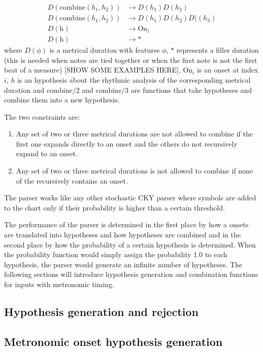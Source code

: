 \begin{align*}
\label{eq:rules}
D(\textrm{combine}(h_1, h_2)) &\rightarrow D(h_1) D(h_2)\\
D(\textrm{combine}(h_1, h_2)) &\rightarrow D(h_1) D(h_2) D((h_3)\\
D(\textrm{h}) &\rightarrow \textrm{On}_i\\
D(\textrm{h}) &\rightarrow *
\end{align*}
where $D(\phi)$ is a metrical duration with features $\phi$, $*$ represents a filler duration (this is needed when notes are tied together or when the first note is not the first beat of a measure) [SHOW SOME EXAMPLES HERE], $\textrm{On}_i$ is an onset at index $i$, $h$ is an hypothesis about the rhythmic analysis of the corresponding metrical duration and $\textrm{combine}/2$ and $\textrm{combine}/3$ are functions that take hypotheses and combine them into a new hypothesis.

The two constraints are:
\begin{enumerate}
\item Any set of two or three metrical durations are not allowed to combine if the first one expands directly to an onset and the others do not recursively expand to an onset.
\item Any set of two or three metrical durations is not allowed to combine if none of the recursively contains an onset.
\end{enumerate}

The parser works like any other stochastic CKY parser where symbols are added to the chart only if their probability is higher than a certain threshold.

The performance of the parser is determined in the first place by how a onsets are translated into hypotheses and how hypotheses are combined and in the second place by how the probability of a certain hypothesis is determined. When the probability function would simply assign the probability 1.0 to each hypothesis, the parser would generate an infinite number of hypotheses. The following sections will introduce hypothesis generation and combination functions for inputs with metronomic timing.

\subsection{Hypothesis generation and rejection}

\subsection{Metronomic onset hypothesis generation}

